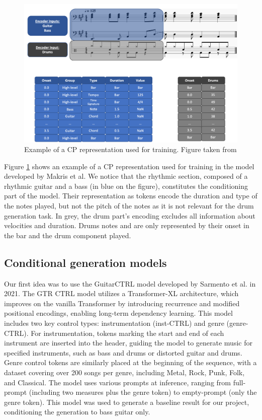 \begin{figure}[h!]
    \centering
    \includegraphics[width=.5\linewidth]{../images-figures/tokenization_makris.png}
    \caption{Example of a CP representation used for training. Figure taken from \cite{makris_conditional_2022}}
    \label{fig:compound_gen_tokenization}
\end{figure}


Figure \ref{fig:compound_gen_tokenization} shows an example of a CP representation used for training in the model developed by Makris et al.
We notice that the rhythmic section, composed of a rhythmic guitar and a bass (in blue on the figure), constitutes the conditioning part of the model.
Their representation as tokens encode the duration and type of the notes played, but not the pitch of the notes as it is not relevant for the drum generation task.
In grey, the drum part's encoding excludes all information about velocities and duration.
Drums notes and are only represented by their onset in the bar and the drum component played.

\subsection{Conditional generation models}

Our first idea was to use the GuitarCTRL model developed by Sarmento et al. in 2021\cite{sarmento_gtr-ctrl_2023}.
The GTR CTRL model utilizes a Transformer-XL architecture\cite{dai_transformer-xl_2019}, which improves on the vanilla Transformer by introducing recurrence and modified positional encodings, enabling long-term dependency learning.
This model includes two key control types: instrumentation (inst-CTRL) and genre (genre-CTRL).
For instrumentation, tokens marking the start and end of each instrument are inserted into the header, guiding the model to generate music for specified instruments, such as bass and drums or distorted guitar and drums.
Genre control tokens are similarly placed at the beginning of the sequence, with a dataset covering over 200 songs per genre, including Metal, Rock, Punk, Folk, and Classical.
The model uses various prompts at inference, ranging from full-prompt (including two measures plus the genre token) to empty-prompt (only the genre token).
This model was used to generate a baseline result for our project, conditioning the generation to bass guitar only.



